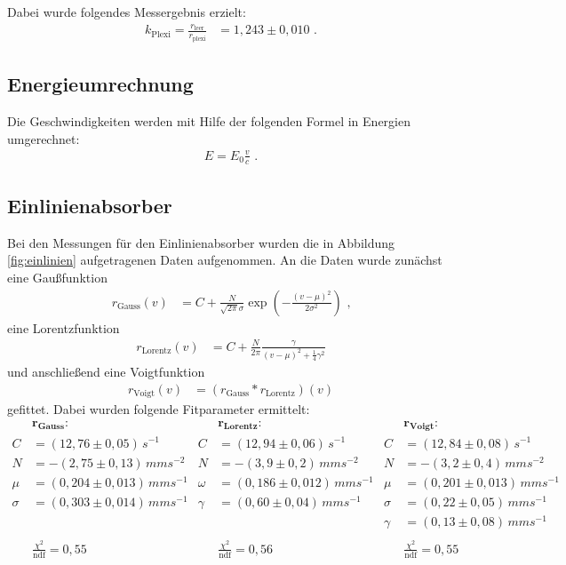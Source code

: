 Dabei wurde folgendes Messergebnis erzielt:
\begin{align}
	k_\text{Plexi}=\frac{r_\text{leer}}{r_\text{plexi}}&=1,243\pm0,010\text{ .}
\end{align}

\subsection{Energieumrechnung}
Die Geschwindigkeiten werden mit Hilfe der folgenden Formel in Energien umgerechnet:
\begin{align}
	E=E_0\frac{v}{c}\text{ .}\label{vtoE}
\end{align}

\subsection{Einlinienabsorber}\label{einlinien}
Bei den Messungen für den Einlinienabsorber wurden die in Abbildung \ref{fig:einlinien} aufgetragenen Daten aufgenommen. An die Daten wurde zunächst eine Gaußfunktion
\begin{align}
	r_\mathrm{Gauss}(v)&=C+\frac{N}{\sqrt{2\pi}\sigma}\exp(-\frac{(v-\mu)^2}{2\sigma^2})\text{ ,}
\end{align}
eine Lorentzfunktion 
\begin{align}
	r_\mathrm{Lorentz}(v)&=C+\frac{N}{2\pi}\frac{\gamma}{\left(v-\mu\right)^2+\frac14\gamma^2}
\end{align}
und anschließend eine Voigtfunktion 
\begin{align}
	r_\mathrm{Voigt}(v)&=\left(r_\mathrm{Gauss}*r_\mathrm{Lorentz}\right)(v)
\end{align}
gefittet. Dabei wurden folgende Fitparameter ermittelt:
\begin{align*}
	&\mathbf{r_\textbf{Gauss}}\textbf{:}&&\mathbf{r_\textbf{Lorentz}}\textbf{:}&&\mathbf{r_\textbf{Voigt}}\textbf{:}\\
	C&=(12,76\pm0,05)\,\si{s^{-1}}&C&=(12,94\pm0,06)\,\si{s^{-1}}&C&=(12,84\pm0,08)\,\si{s^{-1}}
	\\N&=-(2,75\pm0,13)\,\si{mms^{-2}}&N&=-(3,9\pm0,2)\,\si{mms^{-2}}&N&=-(3,2\pm0,4)\,\si{mms^{-2}}
	\\\mu&=(0,204\pm0,013)\,\si{mms^{-1}}&\omega&=(0,186\pm0,012)\,\si{mms^{-1}}&\mu&=(0,201\pm0,013)\,\si{mms^{-1}}
	\\\sigma&=(0,303\pm0,014)\,\si{mms^{-1}}&\gamma&=(0,60\pm0,04)\,\si{mms^{-1}}&\sigma&=(0,22\pm0,05)\,\si{mms^{-1}}
	\\&&&&\gamma&=(0,13\pm0,08)\,\si{mms^{-1}}\\\ 
	\\&\frac{\chi^2}{\mathrm{ndf}}=0,55&&\frac{\chi^2}{\mathrm{ndf}}=0,56&&\frac{\chi^2}{\mathrm{ndf}}=0,55
\end{align*}


